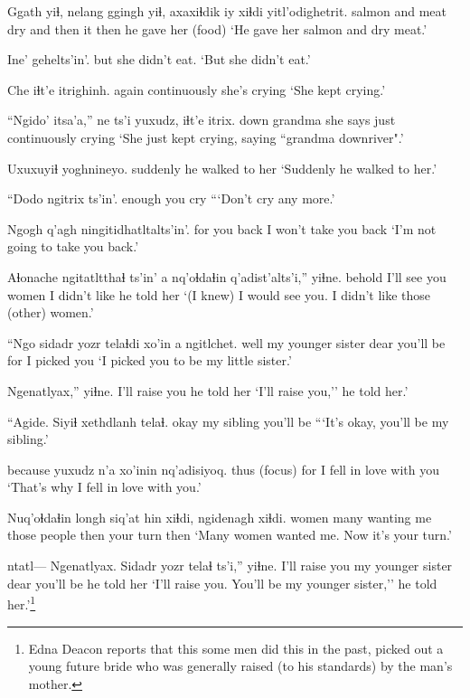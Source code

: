 \documentclass[12pt]{article}
\begin{document}
\gll Ggath yiɬ,  nelang ggingh yiɬ, axaxiɬdik iy xiɬdi yitl'odighetrit.
salmon and meat   dry    and then     it then  {he gave her (food)}
\glt `He gave her salmon and dry meat.'
\glend

\gll Ine' {gehelts'in'.}   
but  {she didn't eat.} 
\glt `But she didn't eat.'
\glend

\gll Che   iɬt'e        itrighinh.
again continuously {she's crying}
\glt `She kept crying.'
\glend

\gll ``Ngido' itsa'a,''  ne       ts'i yuxudz, iɬt'e        itrix.
down   grandma she says        just   continuously crying
\glt `She just kept crying, saying ``grandma downriver".'
\glend

\gll Uxuxuyiɬ  yoghnineyo.
suddenly  {he walked to her}
\glt `Suddenly he walked to her.'
\glend

\gll ``Dodo   ngitrix ts'in'.
enough {you cry}
\glt ```Don't cry any more.'
\glend

\gll Ngogh   q'agh {ningitidhatltalts'in'}.
{for you} back {I won't take you back}
\glt `I'm not going to take you back.'
\glend

\gll Aɬonache ngitatltthaɬ {ts'in' a} nq'oɬdaɬin {q'adist'alts'i},'' yiɬne.
behold   {I'll see you} {}       women       {I didn't like}     {he told her}
\glt `(I knew) I would see you. I didn't like those (other) women.'
\glend

\gll ``Ngo  sidadr            yozr telaɬdi xo'in a ngitlchet. 
well  {my younger sister} dear {you'll be} for   {}   {I picked you}
\glt `I picked you to be my little sister.'
\glend

\gll Ngenatlyax,''       yiɬne.
{I'll raise you} {he told her}
\glt `I'll raise you,'' he told her.'
\glend

\gll ``Agide. {Siyiɬ xethdlanh} telaɬ.
okay   {my sibling}     {you'll be}
\glt ```It's okay, you'll be my sibling.'
\glend

\gll because yuxudz n'a xo'inin nq'adisiyoq.
{} thus   {(focus)}  for     {I fell in love with you}
\glt `That's why I fell in love with you.'
\glend

\gll Nuq'oɬdaɬin longh siq'at hin  xiɬdi, ngidenagh xiɬdi. 
women       many  {wanting me} {those people} then  {your turn} then  
\glt `Many women wanted me. Now it's your turn.'
\glend

\gll ntatl--- Ngenatlyax.    Sidadr            yozr telaɬ ts'i,'' yiɬne.
{} {I'll raise you} {my younger sister} dear {you'll be} {} {he told her}
\glt `I'll raise you. You'll be my younger sister,'' he told her.'\footnote{Edna Deacon reports that this some men did this in the past, picked out a young future bride who was generally raised (to his standards) by the man's mother.}
\glend
\end{document}

